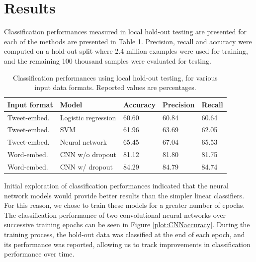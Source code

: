 \section{Results}
Classification performances measured in local hold-out testing are presented for each of the methods are presented in Table \ref{tab:results}. Precision, recall and accuracy were computed on a hold-out split where 2.4 million examples were used for training, and the remaining 100 thousand samples were evaluated for testing.

\begin{table}[h]
  \centering
  \begin{tabular}[c]{lllll}
    Input format&Model&Accuracy&Precision&Recall\\
    \hline
    Tweet-embed.&Logistic regression & 60.60 &    60.84   & 60.64  \\
    Tweet-embed.&SVM             & 61.96    &   63.69     & 62.05   \\
    Tweet-embed.&Neural network & 65.45	& 67.04	& 65.53	 \\
    Word-embed.&CNN w/o dropout &  81.12  & 81.80	& 81.75	 \\
    Word-embed.&CNN w/ dropout & 84.29 & 84.79 & 84.74

  \end{tabular}
  \caption{Classification performances using local hold-out testing, for various input data formats. Reported values are percentages.}
  \label{tab:results}
\end{table}

Initial exploration of classification performances indicated that the neural network models would provide better results than the simpler linear classifiers. For this reason, we chose to train these models for a greater number of epochs. The classification performance of two convolutional neural networks over successive training epochs can be seen in Figure \ref{plot:CNNaccuracy}. During the training process, the hold-out data was classified at the end of each epoch, and its performance was reported, allowing us to track improvements in classification performance over time.

